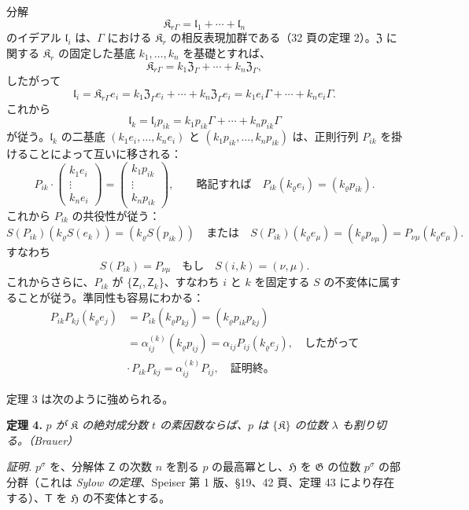 分解
\[
\mathfrak K_{r\Gamma}=\mathfrak l_1+\cdots+\mathfrak l_n
\]
のイデアル \(\mathfrak l_i\) は、\(\Gamma\) における \(\mathfrak K_r\) の相反表現加群である（32 頁の定理 2）。\(\mathfrak Z\) に関する \(\mathfrak K_r\) の固定した基底 \(k_1,\ldots,k_n\) を基礎とすれば、
\[
\mathfrak K_{r\Gamma}=k_1\mathfrak Z_\Gamma+\cdots+k_n\mathfrak Z_\Gamma,
\]
したがって
\[
\mathfrak l_i=\mathfrak K_{r\Gamma}e_i
=k_1\mathfrak Z_\Gamma e_i+\cdots+k_n\mathfrak Z_\Gamma e_i
=k_1e_i\Gamma+\cdots+k_ne_i\Gamma.
\]
これから
\[
\mathfrak l_k=\mathfrak l_i p_{ik}
=k_1p_{ik}\Gamma+\cdots+k_np_{ik}\Gamma
\]
が従う。\(\mathfrak l_k\) の二基底 \((k_1e_i,\ldots,k_ne_i)\) と \((k_1p_{ik},\ldots,k_np_{ik})\) は、正則行列 \(P_{ik}\) を掛けることによって互いに移される：
\[
P_{ik}\cdot
\begin{pmatrix}
k_1e_i\\ \vdots\\ k_ne_i
\end{pmatrix}
=
\begin{pmatrix}
k_1p_{ik}\\ \vdots\\ k_np_{ik}
\end{pmatrix},
\qquad
\text{略記すれば}\quad
P_{ik}(k_\varrho e_i)=(k_\varrho p_{ik}).
\]
これから \(P_{ik}\) の共役性が従う：
\[
S(P_{ik})(k_\varrho S(e_k))=(k_\varrho S(p_{ik}))
\quad\text{または}\quad
S(P_{ik})(k_\varrho e_\mu)=(k_\varrho p_{\nu\mu})
=P_{\nu\mu}(k_\varrho e_\mu).
\]
すなわち
\[
S(P_{ik})=P_{\nu\mu}\quad\text{もし}\quad S(i,k)=(\nu,\mu).
\]
これからさらに、\(P_{ik}\) が \(\{\mathsf{Z}_i,\mathsf{Z}_k\}\)、すなわち \(i\) と \(k\) を固定する \(S\) の不変体に属することが従う。準同性も容易にわかる：
\[
\begin{split}
P_{ik}P_{kj}(k_\varrho e_j)
&=P_{ik}(k_\varrho p_{kj})
=(k_\varrho p_{ik}p_{kj})\\
&=\alpha_{ij}^{(k)}(k_\varrho p_{ij})
=\alpha_{ij}P_{ij}(k_\varrho e_j),
\quad\text{したがって}\\
&\cdot\, P_{ik}P_{kj}=\alpha_{ij}^{(k)}P_{ij},
\quad\text{証明終。}
\end{split}
\]

定理 3 は次のように強められる。

\textbf{定理 4.} \emph{\(p\) が \(\mathfrak K\) の絶対成分数 \(t\) の素因数ならば、\(p\) は \(\{\mathfrak K\}\) の位数 \(\lambda\) も割り切る。（Brauer）}

\emph{証明.} \(p^\sigma\) を、分解体 \(\mathsf{Z}\) の次数 \(n\) を割る \(p\) の最高冪とし、\(\mathfrak H\) を \(\mathfrak G\) の位数 \(p^\sigma\) の部分群（これは \emph{Sylow の定理}、Speiser 第 1 版、\S 19、42 頁、定理 43 により存在する）、\(\mathsf{T}\) を \(\mathfrak H\) の不変体とする。

